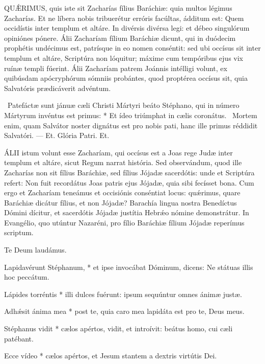 \lettrine[lines=2]{Q}{UǼRIMUS}, quis iste sit Zacharías fílius Baráchiæ: quia multos légimus Zacharías. Et ne líbera nobis tribuerétur erróris facúltas, ádditum est: Quem occidístis inter templum et altáre. In divérsis divérsa legi: et débeo singulórum opiniónes pónere. Álii Zacharíam fílium Baráchiæ dicunt, qui in duódecim prophétis undécimus est, patrísque in eo nomen conséntit: sed ubi occísus sit inter templum et altáre, Scriptúra non lóquitur; máxime cum tempóribus ejus vix ruínæ templi fúerint. Álii Zacharíam patrem Joánnis intélligi volunt, ex quibúsdam apócryphórum sómniis probántes, quod proptérea occísus sit, quia Salvatóris prædicáverit advéntum.

\R\ Patefáctæ sunt jánuæ cæli Christi Mártyri beáto Stéphano, qui in número Mártyrum invéntus est primus: * Et ídeo triúmphat in cælis coronátus. \V\ Mortem enim, quam Salvátor noster dignátus est pro nobis pati, hanc ille primus réddidit Salvatóri. --- Et. Glória Patri. Et.


\lettrine[lines=2]{Á}{LII} istum volunt esse Zacharíam, qui occísus est a Joas rege Judæ inter templum et altáre, sicut Regum narrat história. Sed observándum, quod ille Zacharías non sit fílius Baráchiæ, sed fílius Jójadæ sacerdótis: unde et Scriptúra refert: Non fuit recordátus Joas patris ejus Jójadæ, quia sibi fecísset bona. Cum ergo et Zacharíam teneámus et occisiónis conséntiat locus: quǽrimus, quare Baráchiæ dicátur fílius, et non Jójadæ? Barachía lingua nostra Benedíctus Dómini dícitur, et sacerdótis Jójadæ justítia Hebrǽo nómine demonstrátur. In Evangélio, quo utúntur Nazaréni, pro fílio Baráchiæ fílium Jójadæ reperímus scriptum.

 Te Deum laudámus.



 Lapidavérunt Stéphanum, * et ipse invocábat Dóminum, dicens: Ne státuas illis hoc peccátum.

 Lápides torréntis * illi dulces fuérunt: ipsum sequúntur omnes ánimæ justæ.

 Adhǽsit ánima mea * post te, quia caro mea lapidáta est pro te, Deus meus.

 Stéphanus vidit * cælos apértos, vidit, et introívit: beátus homo, cui cæli patébant.

 Ecce vídeo * cælos apértos, et Jesum stantem a dextris virtútis Dei.

